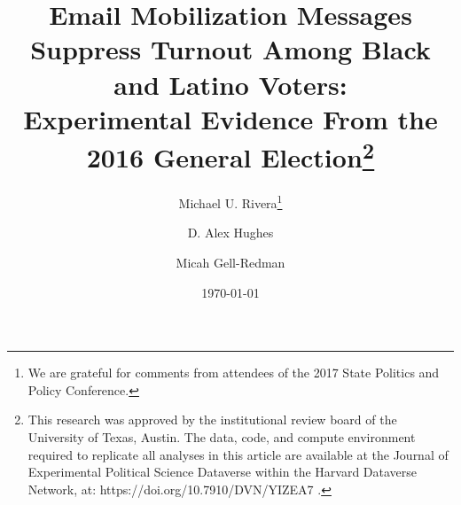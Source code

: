 \documentclass[12pt]{article}
\begin{document}
\author[1]{Michael U. Rivera\thanks{We are grateful for comments from
    attendees of the 2017 State Politics and Policy Conference.}}
\author[1]{D. Alex Hughes} \author[2,3]{Micah Gell-Redman}

\renewcommand\Authands{ and }

\title{Email Mobilization Messages Suppress Turnout Among Black and Latino Voters:\\
  Experimental Evidence From the 2016 General Election\thanks{This
    research was approved by the institutional review board of the
    University of Texas, Austin.  The data, code, and compute
    environment required to replicate all analyses in this article are
    available at the Journal of Experimental Political Science
    Dataverse within the Harvard Dataverse Network, at:
    https://doi.org/10.7910/DVN/YIZEA7 \citep{rivera2020}.}}  \date{\today}

\maketitle



\end{document}
